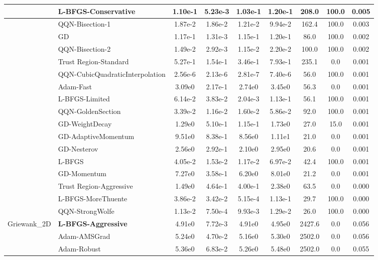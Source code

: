 \documentclass{article}
\begin{document}
\begin{longtable}{|l|l|c|c|c|c|c|c|c|}
 & L-BFGS-Conservative & 1.10e-1 & 5.23e-3 & 1.03e-1 & 1.20e-1 & 208.0 & 100.0 & 0.005 \\
\hline
 & QQN-Bisection-1 & 1.87e-2 & 1.86e-2 & 1.21e-2 & 9.94e-2 & 162.4 & 100.0 & 0.003 \\
\hline
 & GD & 1.17e-1 & 1.31e-3 & 1.15e-1 & 1.20e-1 & 86.0 & 100.0 & 0.002 \\
\hline
 & QQN-Bisection-2 & 1.49e-2 & 2.92e-3 & 1.15e-2 & 2.20e-2 & 100.0 & 100.0 & 0.002 \\
\hline
 & Trust Region-Standard & 5.27e-1 & 1.54e-1 & 3.46e-1 & 7.93e-1 & 235.1 & 0.0 & 0.001 \\
\hline
 & QQN-CubicQuadraticInterpolation & 2.56e-6 & 2.13e-6 & 2.81e-7 & 7.40e-6 & 56.0 & 100.0 & 0.001 \\
\hline
 & Adam-Fast & 3.09e0 & 2.17e-1 & 2.74e0 & 3.45e0 & 56.3 & 0.0 & 0.001 \\
\hline
 & L-BFGS-Limited & 6.14e-2 & 3.83e-2 & 2.04e-3 & 1.13e-1 & 56.1 & 100.0 & 0.001 \\
\hline
 & QQN-GoldenSection & 3.39e-2 & 1.16e-2 & 1.60e-2 & 5.86e-2 & 92.0 & 100.0 & 0.001 \\
\hline
 & GD-WeightDecay & 1.29e0 & 5.10e-1 & 1.15e-1 & 1.73e0 & 27.0 & 15.0 & 0.001 \\
\hline
 & GD-AdaptiveMomentum & 9.51e0 & 8.38e-1 & 8.56e0 & 1.11e1 & 21.0 & 0.0 & 0.001 \\
\hline
 & GD-Nesterov & 2.56e0 & 2.92e-1 & 2.10e0 & 2.95e0 & 20.6 & 0.0 & 0.001 \\
\hline
 & L-BFGS & 4.05e-2 & 1.53e-2 & 1.17e-2 & 6.97e-2 & 42.4 & 100.0 & 0.001 \\
\hline
 & GD-Momentum & 7.27e0 & 3.58e-1 & 6.20e0 & 8.01e0 & 21.2 & 0.0 & 0.001 \\
\hline
 & Trust Region-Aggressive & 1.49e0 & 4.64e-1 & 4.00e-1 & 2.38e0 & 63.5 & 0.0 & 0.000 \\
\hline
 & L-BFGS-MoreThuente & 3.86e-2 & 3.42e-2 & 5.15e-4 & 1.13e-1 & 29.7 & 100.0 & 0.000 \\
\hline
 & QQN-StrongWolfe & 1.13e-2 & 7.50e-4 & 9.93e-3 & 1.29e-2 & 26.0 & 100.0 & 0.000 \\
Griewank\_2D & \textbf{L-BFGS-Aggressive} & 4.91e0 & 7.72e-3 & 4.91e0 & 4.95e0 & 2427.6 & 0.0 & 0.056 \\
\hline
 & Adam-AMSGrad & 5.24e0 & 4.70e-2 & 5.16e0 & 5.30e0 & 2502.0 & 0.0 & 0.056 \\
\hline
 & Adam-Robust & 5.36e0 & 6.83e-2 & 5.26e0 & 5.48e0 & 2502.0 & 0.0 & 0.055 \\

\end{longtable}
\end{document}
